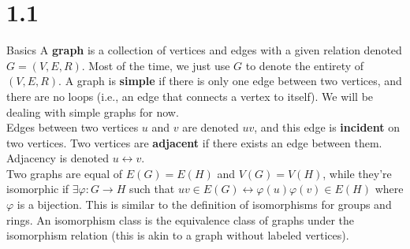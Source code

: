 \documentclass[10pt]{extarticle}
\title{}
\author{Avinash Iyer}
\date{}
\begin{document}
  \section*{1.1}
  \begin{problem}{Basics}
  A \textbf{graph} is a collection of vertices and edges with a given relation denoted $G = (V,E,R)$. Most of the time, we just use $G$ to denote the entirety of $(V,E,R)$. A graph is \textbf{simple} if there is only one edge between two vertices, and there are no loops (i.e., an edge that connects a vertex to itself). We will be dealing with simple graphs for now.\\

  Edges between two vertices $u$ and $v$ are denoted $uv$, and this edge is \textbf{incident} on two vertices. Two vertices are \textbf{adjacent} if there exists an edge between them. Adjacency is denoted $u\leftrightarrow v$.\\

  Two graphs are equal of $E(G) = E(H)$ and $V(G) = V(H)$, while they're isomorphic if $\exists \varphi: G\rightarrow H$ such that $uv\in E(G) \leftrightarrow \varphi(u)\varphi(v)\in E(H)$ where $\varphi$ is a bijection. This is similar to the definition of isomorphisms for groups and rings. An isomorphism class is the equivalence class of graphs under the isomorphism relation (this is akin to a graph without labeled vertices). \\
  \end{problem}
\end{document}
